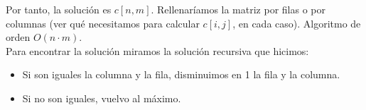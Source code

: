 \begin{ejemplo}
    Por tanto, la solución es $c[n,m]$. Rellenaríamos la matriz por filas o por columnas (ver qué necesitamos para calcular $c[i,j]$, en cada caso). Algoritmo de orden $O(n\cdot m)$.\\

    Para encontrar la solución miramos la solución recursiva que hicimos:
    \begin{itemize}
        \item Si son iguales la columna y la fila, disminuimos en 1 la fila y la columna.
        \item Si no son iguales, vuelvo al máximo.
    \end{itemize}
\end{ejemplo}
